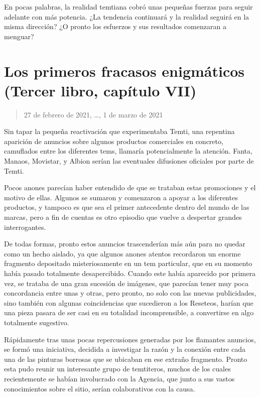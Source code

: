 \documentclass[
]{book}
\begin{document}
En pocas palabras, la realidad temtiana cobró unas pequeñas fuerzas para seguir adelante con más potencia. ¿La tendencia continuará y la realidad seguirá en la misma dirección? ¿O pronto los esfuerzos y sus resultados comenzaran a menguar?

\hypertarget{los-primeros-fracasos-enigmuxe1ticos-tercer-libro-capuxedtulo-vii}{%
\section{Los primeros fracasos enigmáticos (Tercer libro, capítulo VII)}\label{los-primeros-fracasos-enigmuxe1ticos-tercer-libro-capuxedtulo-vii}}

\begin{quote}
27 de febrero de 2021, \ldots, 1 de marzo de 2021
\end{quote}

Sin tapar la pequeña reactivación que experimentaba Temti, una repentina aparición de anuncios sobre algunos productos comerciales en concreto, camuflados entre los diferentes tems, llamaría potencialmente la atención. Fanta, Manaos, Movistar, y Albion serían las eventuales difusiones oficiales por parte de Temti.

Pocos anones parecían haber entendido de que se trataban estas promociones y el motivo de ellas. Algunos se sumaron y comenzaron a apoyar a los diferentes productos, y tampoco es que sea el primer antecedente dentro del mundo de las marcas, pero a fin de cuentas es otro episodio que vuelve a despertar grandes interrogantes.

De todas formas, pronto estos anuncios trascenderían más aún para no quedar como un hecho aislado, ya que algunos anones atentos recordaron un enorme fragmento depositado misteriosamente en un tem particular, que en su momento había pasado totalmente desapercibido. Cuando este había aparecido por primera vez, se trataba de una gran sucesión de imágenes, que parecían tener muy poca concordancia entre unas y otras, pero pronto, no solo con las nuevas publicidades, sino también con algunas coincidencias que sucedieron a los Reseteos, harían que una pieza pasara de ser casi en su totalidad incomprensible, a convertirse en algo totalmente sugestivo.

Rápidamente tras unas pocas repercusiones generadas por los flamantes anuncios, se formó una iniciativa, decidida a investigar la razón y la conexión entre cada una de las pinturas borrosas que se ubicaban en ese extraño fragmento. Pronto esta pudo reunir un interesante grupo de temtiteros, muchos de los cuales recientemente se habían involucrado con la Agencia, que junto a sus vastos conocimientos sobre el sitio, serían colaborativos con la causa.
\end{document}
